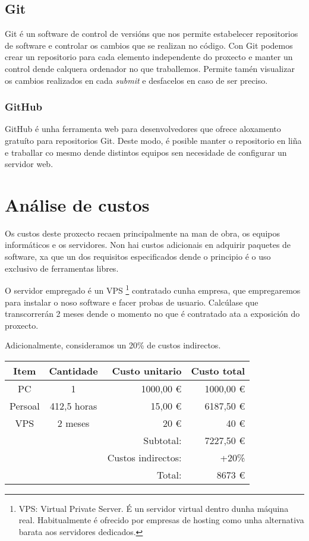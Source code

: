 \subsection{Git}
Git \cite{git} é un software de control de versións que nos permite estabelecer
repositorios de software e controlar os cambios que se realizan no código. Con
Git podemos crear un repositorio para cada elemento independente do proxecto e
manter un control dende calquera ordenador no que traballemos. Permite tamén
visualizar os cambios realizados en cada {\it submit} e desfacelos en caso de
ser preciso.
\subsubsection{GitHub}
GitHub é unha ferramenta web para desenvolvedores que ofrece aloxamento gratuíto
para repositorios Git. Deste modo, é posible manter o repositorio en liña e
traballar co mesmo dende distintos equipos sen necesidade de configurar un
servidor web.

\section{Análise de custos}
Os custos deste proxecto recaen principalmente na man de obra, os equipos
informáticos e os servidores. Non hai custos adicionais en adquirir paquetes de
software, xa que un dos requisitos especificados dende o principio é o uso
exclusivo de ferramentas libres.
\par
O servidor empregado é un VPS \footnote{VPS: Virtual Private Server. É un
servidor virtual dentro dunha máquina real. Habitualmente é ofrecido por
empresas de hosting como unha alternativa barata aos servidores dedicados.}
contratado cunha empresa, que empregaremos para instalar o noso software e facer
probas de usuario.
Calcúlase que transcorrerán 2 meses dende o momento no que é contratado ata a
exposición do proxecto.
\par
Adicionalmente, consideramos un 20\% de custos indirectos.

\begin{tabular} { | c c r | r | }
\hline
Item & Cantidade & Custo unitario & Custo total \\
\hline
PC & 1 & 1000,00 \euro{} & 1000,00 \euro{} \\
\hline
Persoal & 412,5 horas & 15,00 \euro{} & 6187,50 \euro{} \\
\hline
VPS & 2 meses & 20 \euro{} & 40 \euro{} \\
\hline
& & Subtotal: & 7227,50 \euro{} \\
\hline
&& Custos indirectos: & +20\% \\
\hline
&& Total: & 8673 \euro{} \\
\hline
\end{tabular}